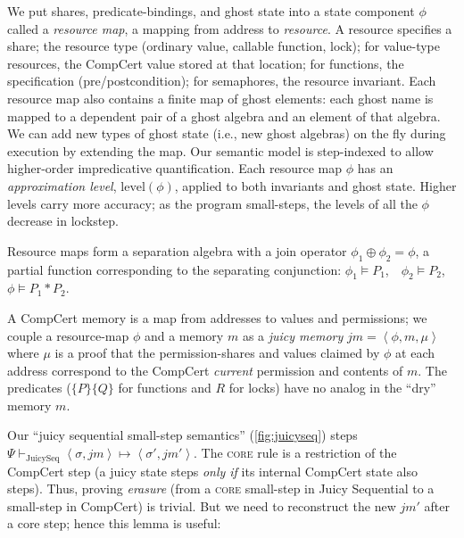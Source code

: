We put shares, predicate-bindings, and ghost state
into a state component $\phi$ called a \emph{resource map},
a mapping from address to \emph{resource}.
A resource specifies a share;
the resource type (ordinary value, callable function, lock);
for value-type resources, the CompCert value stored at that location;
for functions, the specification (pre/postcondition);
for semaphores, the resource invariant.
Each resource map also contains a finite map of ghost elements: each ghost name is mapped to a dependent pair of a ghost algebra and an element of that algebra. We can add new types of ghost state (i.e., new ghost algebras) on the fly during execution by extending the map.
Our semantic model is step-indexed \cite{hobor10:popl} to allow higher-order
impredicative quantification.  Each resource map $\phi$
has an \emph{approximation level},
$\mathrm{level}(\phi)$, applied to both invariants and ghost state.
Higher levels carry more accuracy;
as the program small-steps, the levels of all the $\phi$ decrease in
lockstep.

Resource maps form a separation algebra
with a join operator $\phi_1 \oplus \phi_2 = \phi$,
a partial function
corresponding to the separating conjunction:
$\phi_1 \models P_1$,\ \ $\phi_2 \models P_2$, \ $\phi \models P_1 * P_2$.

A CompCert memory is a map from addresses to values and permissions;
we couple a resource-map $\phi$ and a memory $m$
as a \emph{juicy memory} $\mathit{jm}=\left<\phi,m,\mu\right>$
where $\mu$ is a proof that the permission-shares and values claimed
by $\phi$ at each address correspond to the CompCert \emph{current}
permission and contents of $m$.
The predicates ($\{P\}\{Q\}$ for functions and $R$ for locks)
have no analog in the ``dry'' memory $m$.

Our ``juicy sequential small-step semantics'' (\autoref{fig:juicyseq})
steps $\Psi \vdash_\mathrm{JuicySeq} \left<\sigma,\mathit{jm}\right>
\mapsto \left<\sigma',\mathit{jm}'\right>$.
The \textsc{core} rule is a restriction of the
CompCert step (a juicy state steps \emph{only if} its
internal CompCert state also steps).
Thus, proving \emph{erasure} (from a \textsc{core} small-step
in Juicy Sequential to a small-step in CompCert) is trivial.
But we need to reconstruct the new $\mathit{jm'}$ after
a core step; hence this lemma is useful:

